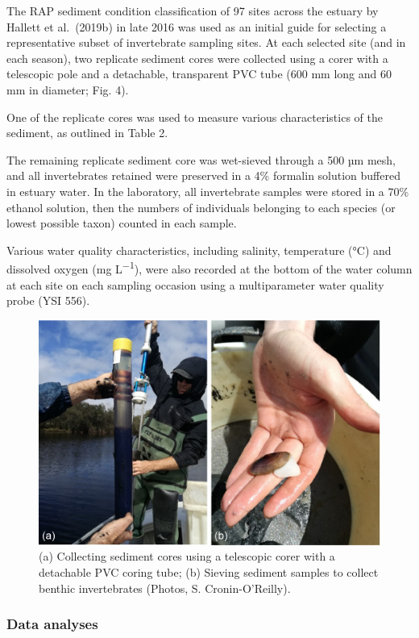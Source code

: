 \documentclass[
]{book}
\begin{document}
The RAP sediment condition classification of 97 sites across the estuary by Hallett et al.~(2019b) in late 2016 was used as an initial guide for selecting a representative subset of invertebrate sampling sites. At each selected site (and in each season), two replicate sediment cores were collected using a corer with a telescopic pole and a detachable, transparent PVC tube (600 mm long and 60 mm in diameter; Fig. 4).~

One of the replicate cores was used to measure various characteristics of the sediment, as outlined in Table 2.

The remaining replicate sediment core was wet-sieved through a 500 µm mesh, and all invertebrates retained were preserved in a 4\% formalin solution buffered in estuary water. In the laboratory, all invertebrate samples were stored in a 70\% ethanol solution, then the numbers of individuals belonging to each species (or lowest possible taxon) counted in each sample.~

Various water quality characteristics, including salinity, temperature (°C) and dissolved oxygen (mg L\textsuperscript{−1}), were also recorded at the bottom of the water column at each site on each sampling occasion using a multiparameter water quality probe (YSI 556).~

\begin{figure}
\includegraphics[width=1\linewidth]{images/BMI/picture6} \caption{(a) Collecting sediment cores using a telescopic corer with a detachable PVC coring tube; (b) Sieving sediment samples to collect benthic invertebrates (Photos, S. Cronin-O’Reilly).}\label{fig:BMI-pic6}
\end{figure}

\hypertarget{data-analyses}{%
\subsubsection{Data analyses}\label{data-analyses}}
\end{document}
